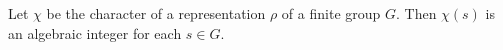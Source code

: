 Let $\chi$ be the character of a representation $\rho$ of a finite group $G$. Then $\chi(s)$ is an algebraic integer for each $s \in G$.
